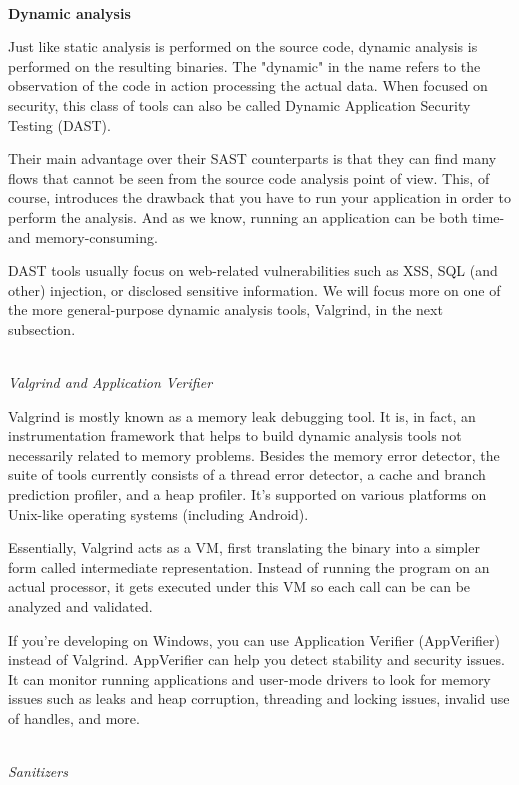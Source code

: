 \hspace*{\fill} \\ %
\noindent
\textbf{Dynamic analysis}

Just like static analysis is performed on the source code, dynamic analysis is performed on the resulting binaries. The "dynamic" in the name refers to the observation of the code in action processing the actual data. When focused on security, this class of tools can also be called Dynamic Application Security Testing (DAST).

Their main advantage over their SAST counterparts is that they can find many flows that cannot be seen from the source code analysis point of view. This, of course, introduces the drawback that you have to run your application in order to perform the analysis. And as we know, running an application can be both time- and memory-consuming.

DAST tools usually focus on web-related vulnerabilities such as XSS, SQL (and other) injection, or disclosed sensitive information. We will focus more on one of the more general-purpose dynamic analysis tools, Valgrind, in the next subsection.

\hspace*{\fill} \\ %
\noindent
\textit{Valgrind and Application Verifier}

Valgrind is mostly known as a memory leak debugging tool. It is, in fact, an instrumentation framework that helps to build dynamic analysis tools not necessarily related to memory problems. Besides the memory error detector, the suite of tools currently consists of a thread error detector, a cache and branch prediction profiler, and a heap profiler. It's supported on various platforms on Unix-like operating systems (including Android).

Essentially, Valgrind acts as a VM, first translating the binary into a simpler form called intermediate representation. Instead of running the program on an actual processor, it gets executed under this VM so each call can be can be analyzed and validated.

If you're developing on Windows, you can use Application Verifier (AppVerifier) instead of Valgrind. AppVerifier can help you detect stability and security issues. It can monitor running applications and user-mode drivers to look for memory issues such as leaks and heap corruption, threading and locking issues, invalid use of handles, and more.

\hspace*{\fill} \\ %
\noindent
\textit{Sanitizers}

